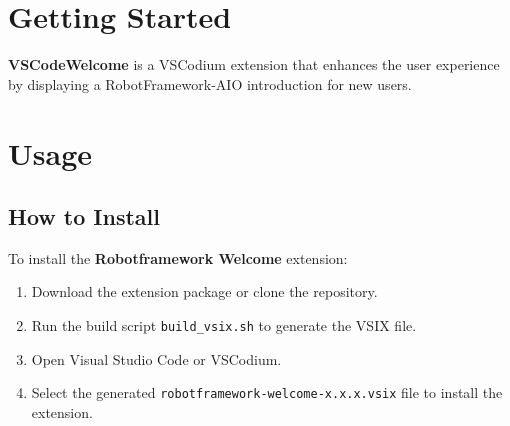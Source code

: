 %



%

\hypertarget{description-getting-started}{%
\section{Getting Started}\label{description-getting-started}}

\textbf{VSCodeWelcome} is a VSCodium extension that enhances the user
experience by displaying a RobotFramework-AIO introduction for new
users.

\hypertarget{description-usage}{%
\section{Usage}\label{description-usage}}

\subsection{How to Install}

To install the \textbf{Robotframework Welcome} extension:

\begin{enumerate}
    \item Download the extension package or clone the repository.
    \item Run the build script \texttt{build\_vsix.sh} to generate the VSIX file.
    \item Open Visual Studio Code or VSCodium.
    \item Select the generated \texttt{robotframework-welcome-x.x.x.vsix} file to install the extension.
\end{enumerate}

